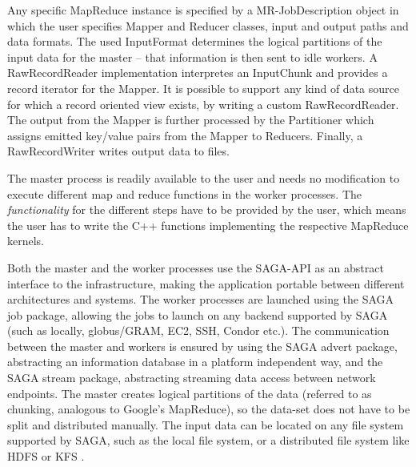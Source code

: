 \documentclass[3p,twocolumn]{elsarticle}
\begin{document}
Any specific MapReduce instance
is specified by a MR-JobDescription object in which the user specifies 
Mapper and Reducer classes, input and output paths and data formats.  The
used InputFormat determines the logical partitions of the input data for
the master -- that information is then sent to idle workers.  A
Raw\-Record\-Reader implementation interpretes an
InputChunk and provides a record iterator for the Mapper. It is
possible to support any kind of data source for which a record
oriented view exists, by writing a custom Raw\-Record\-Reader.
The output from the Mapper is further processed by the Partitioner
which assigns emitted key/value pairs from the Mapper to Reducers.
Finally, a Raw\-Record\-Writer writes output data to files.

The master process is readily available to the user and needs no
modification to execute different map and reduce functions in the
worker processes.
The \textit{functionality} for the different steps have to be provided by
the user, which means the user has to write the C++ functions
implementing the respective MapReduce kernels.

Both the master and the worker processes use the SAGA-API as an
abstract interface to the  infrastructure, making the application
portable between different architectures and systems.  The worker
processes are launched using the SAGA job package, allowing the jobs
to launch on any backend supported by SAGA (such as locally, globus/GRAM, 
EC2, SSH, Condor etc.).  The communication between the master and workers
is ensured by using the SAGA advert package, abstracting an
information database in a platform independent way, and the SAGA stream
package, abstracting streaming data access between network endpoints.
The master creates logical partitions of the data (referred to as chunking,
analogous to Google's MapReduce), so the data-set does not have to be split
and distributed manually.  The input data can be located on any file system
supported by SAGA, such as the local file system, or a distributed file system
like HDFS or KFS \cite{KFS}.
\end{document}

